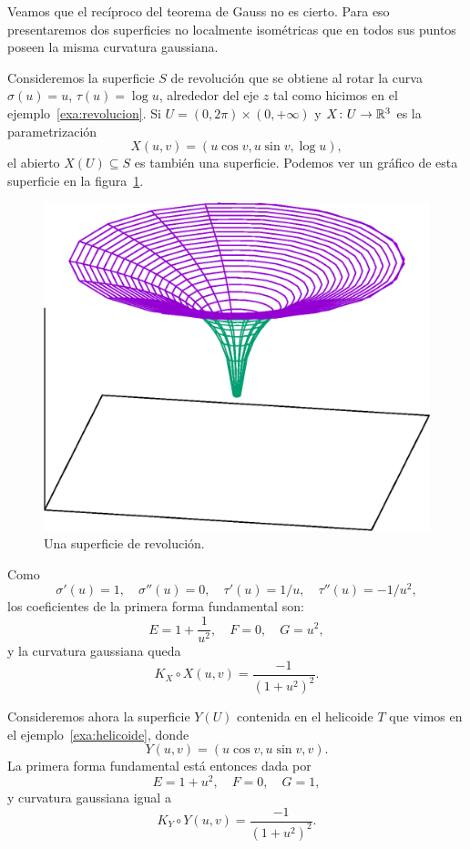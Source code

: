Veamos que el recíproco del teorema de Gauss no es cierto. Para eso
presentaremos dos superficies no localmente isométricas que en todos sus puntos
poseen la misma curvatura gaussiana. 

\begin{example}
	Consideremos la superficie $S$ de revolución que se obtiene al rotar la
	curva
	$\sigma(u)=u$, $\tau(u)=\log u$, 
	alrededor del eje $z$ tal como hicimos en el ejemplo~\ref{exa:revolucion}. 
	Si $U=(0,2\pi)\times(0,+\infty)$ y $X\colon U\to\mathbb{R}^3$ es la parametrización
	\[
		X(u,v)=(u\cos v,u\sin v,\log u),
	\]
	el abierto $X(U)\subseteq S$ es también una superficie.  Podemos ver un
	gráfico de esta superficie en la figura~\ref{fig:egregium}. 
	\begin{figure}
		\centering
    	\includegraphics[scale=0.3]{eps/revolucion}
		\caption{Una superficie de revolución.}
		\label{fig:egregium}
	\end{figure}
	Como 
	\[
		\sigma'(u)=1,\quad
		\sigma''(u)=0,\quad
		\tau'(u)=1/u,\quad
		\tau''(u)=-1/u^2,
	\]
	los coeficientes de la primera forma fundamental son:
	\[
		E=1+\frac{1}{u^2},\quad
		F=0,\quad
		G=u^2,
	\]
	y la curvatura gaussiana queda
	\[
		K_X\circ X(u,v)=\frac{-1}{(1+u^2)^2}.
	\]

	Consideremos ahora la superficie $Y(U)$ contenida en el helicoide $T$ que
	vimos en el ejemplo~\ref{exa:helicoide}, donde 
	\[
	Y(u,v)=(u\cos v,u\sin v,v).
	\]
	La primera forma fundamental está entonces dada por
	\[
		E=1+u^2,\quad
		F=0,\quad
		G=1,
	\]
	y curvatura gaussiana igual a 
	\[	
		K_Y\circ Y(u,v)=\frac{-1}{(1+u^2)^2}.
	\]


\end{example}

